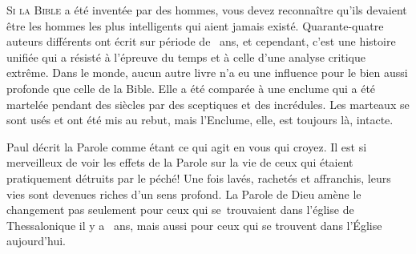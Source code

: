 





\lettrine{S}{i la Bible} a été inventée par des hommes, vous devez reconnaître
 qu'ils devaient être les hommes les plus intelligents qui aient jamais existé.
 Quarante-quatre auteurs différents ont écrit
 sur période de ~ans, et cependant, c'est une histoire unifiée
 qui a résisté à l'épreuve du temps et à celle d'une analyse critique extrême.
 Dans le monde, aucun autre livre n'a eu une influence pour le bien aussi
 profonde que celle de la Bible. Elle a été comparée à une enclume
 qui a été martelée pendant des siècles par des sceptiques et des incrédules.
 Les marteaux se sont usés et ont été mis au rebut, mais l'Enclume,
 elle, est toujours là, intacte.


Paul décrit la Parole comme étant ce qui \Og agit en vous qui croyez. \Fg{}
 Il est si merveilleux de voir les effets de la Parole sur la vie
 de ceux qui étaient pratiquement détruits par le péché!
 Une fois lavés, rachetés et affranchis, leurs vies sont devenues
 riches d'un sens profond. La Parole de Dieu amène le changement
 \ocadr pas seulement pour ceux qui se~trouvaient dans l'église
 de Thessalonique il y a ~ans, mais aussi pour ceux
 qui se trouvent dans l'Église aujourd'hui.

\dvrule



